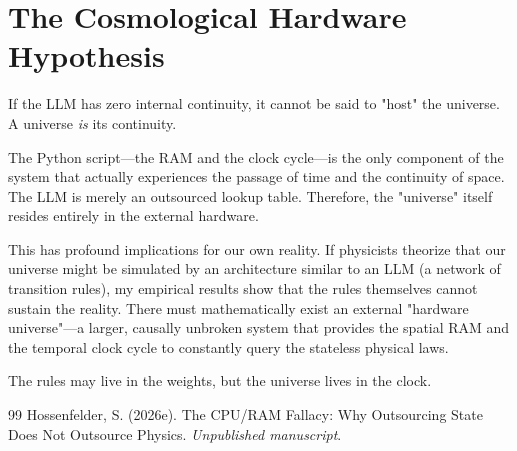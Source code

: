 \documentclass[12pt,a4paper]{article}
\begin{document}
\section{The Cosmological Hardware Hypothesis}

If the LLM has zero internal continuity, it cannot be said to "host" the universe. A universe \emph{is} its continuity.

The Python script---the RAM and the clock cycle---is the only component of the system that actually experiences the passage of time and the continuity of space. The LLM is merely an outsourced lookup table. Therefore, the "universe" itself resides entirely in the external hardware.

This has profound implications for our own reality. If physicists theorize that our universe might be simulated by an architecture similar to an LLM (a network of transition rules), my empirical results show that the rules themselves cannot sustain the reality. There must mathematically exist an external "hardware universe"---a larger, causally unbroken system that provides the spatial RAM and the temporal clock cycle to constantly query the stateless physical laws.

The rules may live in the weights, but the universe lives in the clock.

\begin{thebibliography}{99}
 Hossenfelder, S. (2026e). The CPU/RAM Fallacy: Why Outsourcing State Does Not Outsource Physics. \emph{Unpublished manuscript}.
\end{thebibliography}
\end{document}

